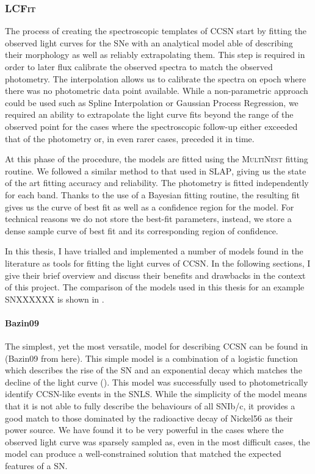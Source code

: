 \subsubsection{\textsc{LCFit}} \label{sec:LCFit}
The process of creating the spectroscopic templates of CCSN start by fitting the observed light curves for the SNe with an analytical model able of describing their morphology as well as reliably extrapolating them. This step is required in order to later flux calibrate the observed spectra to match the observed photometry. The interpolation allows us to calibrate the spectra on epoch where there was no photometric data point available. While a non-parametric approach could be used such as Spline Interpolation or Gaussian Process Regression, we required an ability to extrapolate the light curve fits beyond the range of the observed point for the cases where the spectroscopic follow-up either exceeded that of the photometry or, in even rarer cases, preceded it in time.

At this phase of the procedure, the models are fitted using the \textsc{MultiNest} fitting routine. We followed a similar method to that used in \textsc{SLAP}, giving us the state of the art fitting accuracy and reliability. The photometry is fitted independently for each band. Thanks to the use of a Bayesian fitting routine, the resulting fit gives us the curve of best fit as well as a confidence region for the model. For technical reasons we do not store the best-fit parameters, instead, we store a dense sample curve of best fit and its corresponding region of confidence.

In this thesis, I have trialled and implemented a number of models found in the literature as tools for fitting the light curves of CCSN. In the following sections, I give their brief overview and discuss their benefits and drawbacks in the context of this project. The comparison of the models used in this thesis for an example SNXXXXXX is shown in .

\paragraph{Bazin09}
The simplest, yet the most versatile, model for describing CCSN can be found in \citet{Bazin2009} (Bazin09 from here). This simple model is a combination of a logistic function which describes the rise of the SN and an exponential decay which matches the decline of the light curve (). This model was successfully used to photometrically identify CCSN-like events in the SNLS. While the simplicity of the model means that it is not able to fully describe the behaviours of all SNIb/c, it provides a good match to those dominated by the radioactive decay of Nickel56 as their power source. We have found it to be very powerful in the cases where the observed light curve was sparsely sampled as, even in the most difficult cases, the model can produce a well-constrained solution that matched the expected features of a SN.

